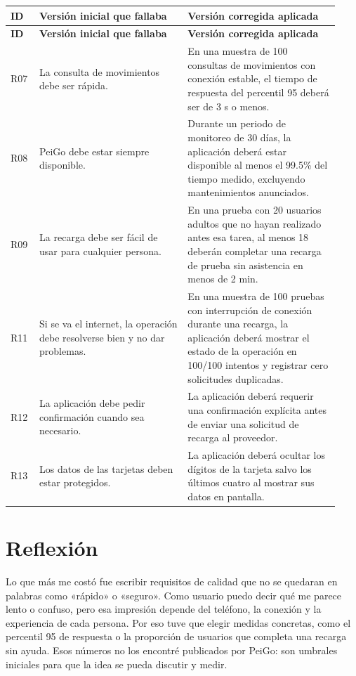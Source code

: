 \documentclass[10pt,letterpaper]{article}
\begin{document}
\small
\begin{longtable}{@{}p{0.08\linewidth}p{0.42\linewidth}p{0.43\linewidth}@{}}
\toprule\rowcolor{azulclaro}\textbf{ID}&\textbf{Versión inicial que fallaba}&\textbf{Versión corregida aplicada}\\\midrule\endfirsthead
\toprule\rowcolor{azulclaro}\textbf{ID}&\textbf{Versión inicial que fallaba}&\textbf{Versión corregida aplicada}\\\midrule\endhead
R07&La consulta de movimientos debe ser rápida.&En una muestra de 100 consultas de movimientos con conexión estable, el tiempo de respuesta del percentil 95 deberá ser de 3 s o menos.\\
R08&PeiGo debe estar siempre disponible.&Durante un periodo de monitoreo de 30 días, la aplicación deberá estar disponible al menos el 99.5\% del tiempo medido, excluyendo mantenimientos anunciados.\\
R09&La recarga debe ser fácil de usar para cualquier persona.&En una prueba con 20 usuarios adultos que no hayan realizado antes esa tarea, al menos 18 deberán completar una recarga de prueba sin asistencia en menos de 2 min.\\
R11&Si se va el internet, la operación debe resolverse bien y no dar problemas.&En una muestra de 100 pruebas con interrupción de conexión durante una recarga, la aplicación deberá mostrar el estado de la operación en 100/100 intentos y registrar cero solicitudes duplicadas.\\
R12&La aplicación debe pedir confirmación cuando sea necesario.&La aplicación deberá requerir una confirmación explícita antes de enviar una solicitud de recarga al proveedor.\\
R13&Los datos de las tarjetas deben estar protegidos.&La aplicación deberá ocultar los dígitos de la tarjeta salvo los últimos cuatro al mostrar sus datos en pantalla.\\
\bottomrule
\end{longtable}
\normalsize

\section{Reflexión}
Lo que más me costó fue escribir requisitos de calidad que no se quedaran en palabras como «rápido» o «seguro». Como usuario puedo decir qué me parece lento o confuso, pero esa impresión depende del teléfono, la conexión y la experiencia de cada persona. Por eso tuve que elegir medidas concretas, como el percentil 95 de respuesta o la proporción de usuarios que completa una recarga sin ayuda. Esos números no los encontré publicados por PeiGo: son umbrales iniciales para que la idea se pueda discutir y medir.
\end{document}
